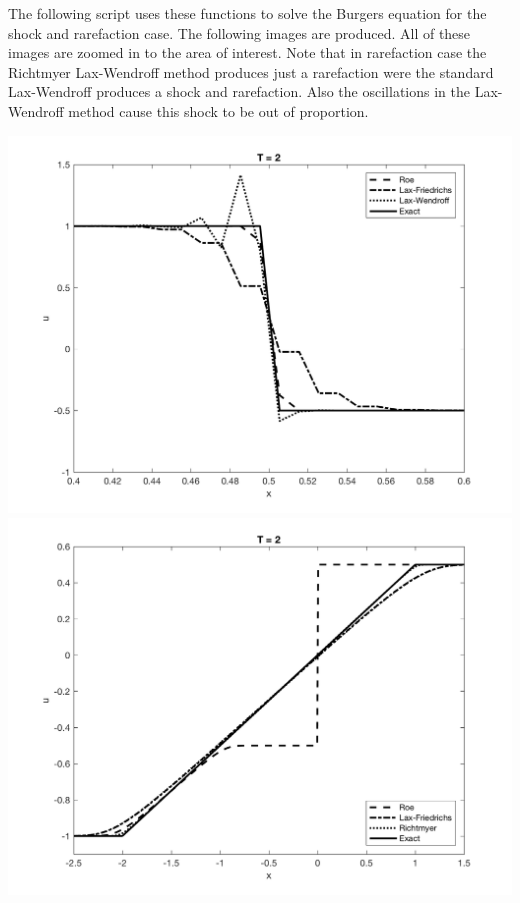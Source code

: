 \documentclass[11pt, oneside]{article}
\begin{document}
\begin{enumerate}
    The following script uses these functions to solve the Burgers equation for
    the shock and rarefaction case.
    The following images are produced.
    All of these images are zoomed in to the area of interest.
    Note that in rarefaction case the Richtmyer Lax-Wendroff method produces
    just a rarefaction were the standard Lax-Wendroff produces a shock and
    rarefaction.
    Also the oscillations in the Lax-Wendroff method cause this shock to be out
    of proportion.
    \begin{center}
      \includegraphics[scale=0.5]{Figures/03_01.png}
      \includegraphics[scale=0.5]{Figures/03_02.png}

\end{center}
\end{enumerate}
\end{document}
